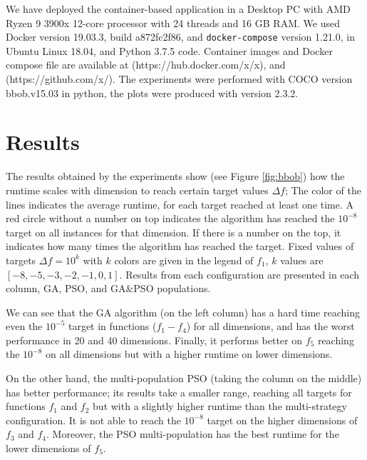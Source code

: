 \documentclass[runningheads]{llncs}
\begin{document}
We have deployed the container-based application in a
Desktop PC with AMD Ryzen 9 3900x 12-core processor with 24 threads 
and 16 GB RAM. We used Docker version 19.03.3, build a872fc2f86, and {\tt docker-compose} version 1.21.0, 
in Ubuntu Linux 18.04, and Python 3.7.5 code. Container images and Docker compose file are available at
(https://hub.docker.com/x/x), and (https://github.com/x/). 
The experiments were performed with COCO \cite{hansen2016coco} version bbob.v15.03 in python, 
the plots were produced with version 2.3.2.


\section{Results}
\label{results}

The results obtained by the experiments show (see Figure \ref{fig:bbob}) how
the runtime scales with dimension to reach certain target values $\Delta f$;
The color of the lines indicates the average runtime, for each target reached
at least one time. A red circle without a number on top indicates the algorithm
has reached the $10^{-8}$ target on all instances for that dimension. If there
is a number on the top, it indicates how many times the algorithm has reached
the target. Fixed values of targets $\Delta f = 10^{k}$ with $k$ colors are
given in the legend of $f_1$, $k$ values are $[-8,-5,-3,-2,-1,0,1]$. Results
from each configuration are presented in each column, GA, PSO, and GA\&PSO
populations.

We can see that the GA algorithm (on the left column) has a hard time reaching even the
$10^{-5}$ target in functions ($f_1-f_4$) for all dimensions, and has the worst
performance in 20 and 40 dimensions. Finally, it performs better on $f_5$
reaching the $10^{-8}$ on all dimensions but with a higher runtime on lower
dimensions.

On the other hand, the multi-population PSO (taking the column on the middle) 
has better performance; its results take a smaller range,
reaching all targets for functions $f_1$ and $f_2$ but with a slightly higher
runtime than the multi-strategy configuration. It is not able to reach the
$10^{-8}$ target on the higher dimensions of $f_3$ and $f_4$. Moreover, the PSO
multi-population has the best runtime for the lower dimensions of $f_5$.
\end{document}
